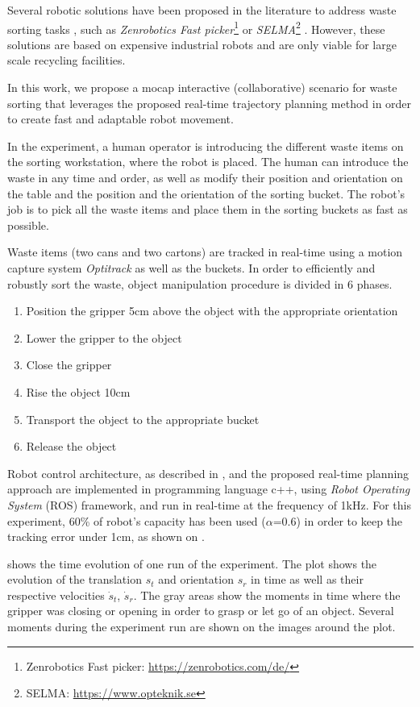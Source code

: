 Several robotic solutions have been proposed in the literature to address waste sorting tasks \cite{SARC2019}, such as \textit{Zenrobotics Fast picker}\footnote{Zenrobotics Fast picker: \url{https://zenrobotics.com/de/}} or \textit{SELMA}\footnote{SELMA: \url{https://www.opteknik.se}} . However, these solutions are based on expensive industrial robots and are only viable for large scale recycling facilities.

In this work, we propose a mocap interactive (collaborative) scenario for waste sorting that leverages the proposed real-time trajectory planning method in order to create fast and adaptable robot movement. 

In the experiment, a human operator is introducing the different waste items on the sorting workstation, where the robot is placed. The human can introduce the waste in any time and order, as well as modify their position and orientation on the table and the position and the orientation of the sorting bucket. The robot's job is to pick all the waste items and place them in the sorting buckets as fast as possible.

Waste items (two cans and two cartons) are tracked in real-time using a motion capture system \textit{Optitrack} as well as the buckets. In order to efficiently and robustly sort the waste, object manipulation procedure is divided in 6 phases.
\begin{enumerate}
    \item Position the gripper 5cm above the object with the appropriate orientation
    \item Lower the gripper to the object
    \item Close the gripper
    \item Rise the object 10cm
    \item Transport the object to the appropriate bucket
    \item Release the object
\end{enumerate}

Robot control architecture, as described in , and the proposed real-time planning approach are implemented in 
programming language c++, using \textit{Robot Operating System} (ROS) framework, and run in real-time at the frequency of 1kHz. For this experiment, 60\% of robot's capacity has been used ($\alpha$=0.6) in order to keep the tracking error under 1cm, as shown on .

 shows the time evolution of one run of the experiment. The plot shows the evolution of the translation $s_t$ and orientation $s_r$ in time as well as their respective velocities  $\dot{s}_t$,  $\dot{s}_r$. The gray areas show the moments in time where the gripper was closing or opening in order to grasp or let go of an object. Several moments during the experiment run are shown on the images around the plot.

